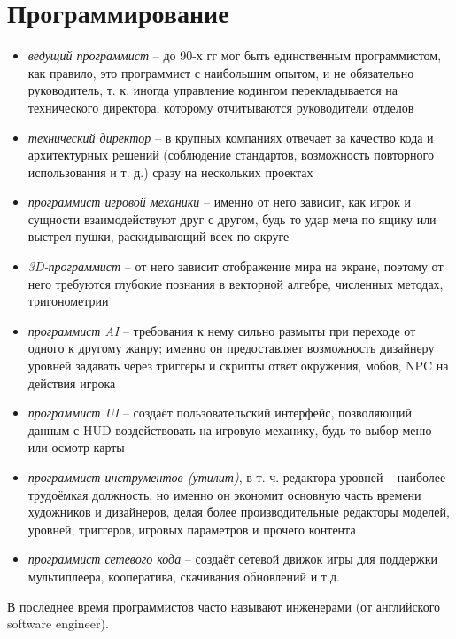 \section{Программирование}
\begin{itemize}
    \item \emph{ведущий программист} -- до 90-х гг мог быть единственным программистом, как правило, это 
        программист с наибольшим опытом, и не обязательно руководитель, т. к. иногда управление кодингом 
        перекладывается на технического директора, которому отчитываются руководители отделов
    \item \emph{технический директор} -- в крупных компаниях отвечает за качество кода и архитектурных 
        решений (соблюдение стандартов, возможность повторного использования и т. д.) сразу на нескольких 
        проектах
    \item \emph{программист игровой механики} -- именно от него зависит, как игрок и сущности 
        взаимодействуют друг с другом, будь то удар меча по ящику или выстрел пушки, раскидывающий всех по 
        округе
    \item \emph{3D-программист} -- от него зависит отображение мира на экране, поэтому от него требуются 
        глубокие познания в векторной алгебре, численных методах, тригонометрии
    \item \emph{программист AI} -- требования к нему сильно размыты при переходе от одного к другому 
        жанру; именно он предоставляет возможность дизайнеру уровней задавать через триггеры и скрипты 
        ответ окружения, мобов, NPC на действия игрока
    \item \emph{программист UI} -- создаёт пользовательский интерфейс, позволяющий данным с HUD 
        воздействовать на игровую механику, будь то выбор меню или осмотр карты
    \item \emph{программист инструментов (утилит)}, в т. ч. редактора уровней -- наиболее трудоёмкая 
        должность, но именно он экономит основную часть времени художников и дизайнеров, делая более 
        производительные редакторы моделей, уровней, триггеров, игровых параметров и прочего контента
    \item \emph{программист сетевого кода} -- создаёт сетевой движок игры для поддержки мультиплеера, 
        кооператива, скачивания обновлений и т.д.
\end{itemize}
В последнее время программистов часто называют инженерами (от английского software engineer).

